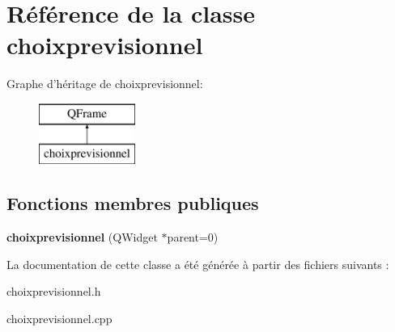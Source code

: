 \hypertarget{classchoixprevisionnel}{\section{Référence de la classe choixprevisionnel}
\label{classchoixprevisionnel}
}
Graphe d'héritage de choixprevisionnel\+:\begin{figure}[H]
\begin{center}
\leavevmode
\includegraphics[height=2.000000cm]{classchoixprevisionnel}
\end{center}
\end{figure}
\subsection*{Fonctions membres publiques}
\begin{DoxyCompactItemize}
\item 
\hypertarget{classchoixprevisionnel_ab1e7bdc8754f678ad9146ee35dc65c7c}{{\bfseries choixprevisionnel} (Q\+Widget $\ast$parent=0)}\label{classchoixprevisionnel_ab1e7bdc8754f678ad9146ee35dc65c7c}

\end{DoxyCompactItemize}


La documentation de cette classe a été générée à partir des fichiers suivants \+:\begin{DoxyCompactItemize}
\item 
choixprevisionnel.\+h\item 
choixprevisionnel.\+cpp\end{DoxyCompactItemize}
